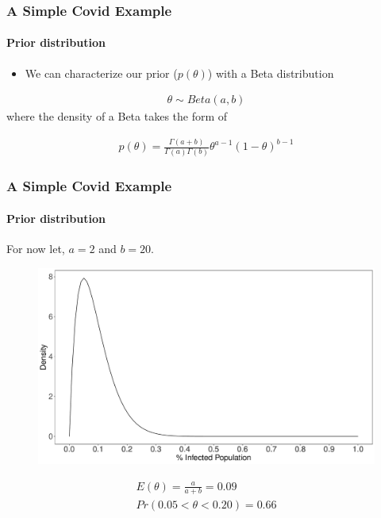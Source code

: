 \documentclass[
  shownotes,
  xcolor={svgnames},
  hyperref={colorlinks,citecolor=DarkBlue,linkcolor=DarkRed,urlcolor=DarkBlue}
  , aspectratio=169]{beamer}
\begin{document}
\begin{frame}[fragile]
\frametitle{A Simple Covid Example}
\framesubtitle{Prior distribution}

\begin{itemize}
\item We can characterize our prior ($p(\theta)$) with a Beta distribution 
\end{itemize}


\begin{align}
\theta \sim Beta(a,b)
\end{align}
where the density of a Beta takes the form of

\begin{align}
p(\theta)=\frac{\Gamma\left(a+b\right)}{\Gamma\left(a\right)\Gamma\left(b\right)}\theta^{a-1}\left(1-\theta\right)^{b-1}
\end{align}

\end{frame}
\begin{frame}[fragile]
\frametitle{A Simple Covid Example}
\framesubtitle{Prior distribution}

For now let, $a=2$ and $b=20$. 

 \begin{figure}[H] \centering
  \centering
  \includegraphics[scale=0.25]{figures/fig_beta}
  \\
  \tiny 
\end{figure}

\begin{align}
E(\theta) =\frac{a}{a+b} =0.09 \\
Pr(0.05 < \theta < 0.20) = 0.66
\end{align}

\end{frame}
\end{document}
